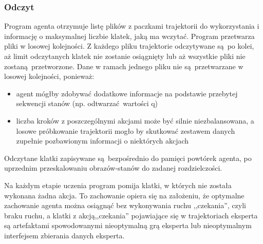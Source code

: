 \subsubsection{Odczyt}

Program agenta otrzymuje listę plików z paczkami trajektorii do wykorzystania i informację o maksymalnej liczbie klatek, jaką ma wczytać. Program przetwarza pliki w losowej kolejności. Z każdego pliku trajektorie odczytywane są po kolei, aż limit odczytanych klatek nie zostanie osiągnięty lub aż wszystkie pliki nie zostaną przetworzone.
Dane w ramach jednego pliku nie są przetwarzane w losowej kolejności, ponieważ:
\begin{itemize}
\item{agent mógłby zdobywać dodatkowe informacje na podstawie przebytej sekwencji stanów (np. odtwarzać wartości q)}
\item{liczba kroków z poszczególnymi akcjami może być silnie niezbalansowana, a losowe próbkowanie trajektorii mogło by skutkować zestawem danych zupełnie pozbawionym informacji o niektórych akcjach}
\end{itemize}
Odczytane klatki zapisywane są bezpośrednio do pamięci powtórek agenta, po uprzednim przeskalowaniu obrazów-stanów do zadanej rozdzielczości.

Na każdym etapie uczenia program pomija klatki, w których nie została wykonana żadna akcja. To zachowanie opiera się na założeniu, że optymalne zachowanie agenta można osiągnąć bez wykonywania ruchu ,,czekania'', czyli braku ruchu, a klatki z akcją,,czekania'' pojawiające się w trajektoriach eksperta są artefaktami spowodowanymi nieoptymalną grą eksperta lub nieoptymalnym interfejsem zbierania danych eksperta.
